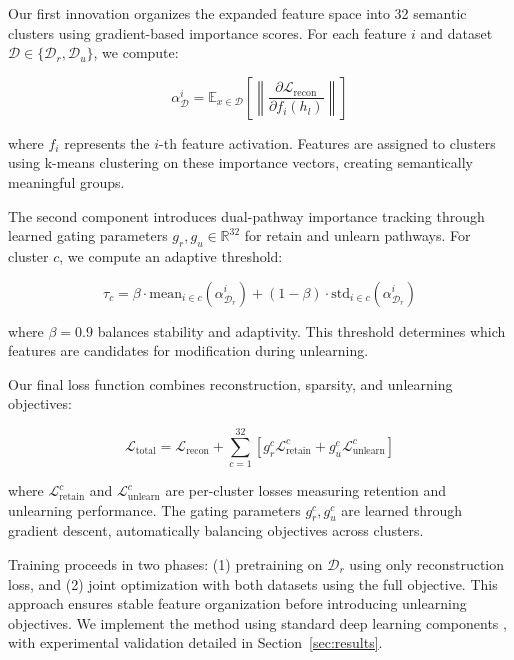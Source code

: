 \documentclass{article} %
\begin{document}
Our first innovation organizes the expanded feature space into 32 semantic clusters using gradient-based importance scores. For each feature $i$ and dataset $\mathcal{D} \in \{\mathcal{D}_r, \mathcal{D}_u\}$, we compute:

\begin{equation}
\label{eq:importance}
\alpha_{\mathcal{D}}^i = \mathbb{E}_{x \in \mathcal{D}} \left[\left\|\frac{\partial \mathcal{L}_{\text{recon}}}{\partial f_i(h_l)}\right\|\right]
\end{equation}

where $f_i$ represents the $i$-th feature activation. Features are assigned to clusters using k-means clustering on these importance vectors, creating semantically meaningful groups.

The second component introduces dual-pathway importance tracking through learned gating parameters $g_r, g_u \in \mathbb{R}^{32}$ for retain and unlearn pathways. For cluster $c$, we compute an adaptive threshold:

\begin{equation}
\label{eq:threshold}
\tau_c = \beta \cdot \text{mean}_{i \in c}(\alpha_{\mathcal{D}_r}^i) + (1-\beta) \cdot \text{std}_{i \in c}(\alpha_{\mathcal{D}_r}^i)
\end{equation}

where $\beta=0.9$ balances stability and adaptivity. This threshold determines which features are candidates for modification during unlearning.

Our final loss function combines reconstruction, sparsity, and unlearning objectives:

\begin{equation}
\label{eq:loss}
\mathcal{L}_{\text{total}} = \mathcal{L}_{\text{recon}} + \sum_{c=1}^{32} [g_r^c\mathcal{L}_{\text{retain}}^c + g_u^c\mathcal{L}_{\text{unlearn}}^c]
\end{equation}

where $\mathcal{L}_{\text{retain}}^c$ and $\mathcal{L}_{\text{unlearn}}^c$ are per-cluster losses measuring retention and unlearning performance. The gating parameters $g_r^c, g_u^c$ are learned through gradient descent, automatically balancing objectives across clusters.

Training proceeds in two phases: (1) pretraining on $\mathcal{D}_r$ using only reconstruction loss, and (2) joint optimization with both datasets using the full objective. This approach ensures stable feature organization before introducing unlearning objectives. We implement the method using standard deep learning components \cite{paszke2019pytorch,loshchilov2017adamw,ba2016layer}, with experimental validation detailed in Section~\ref{sec:results}.
\end{document}

